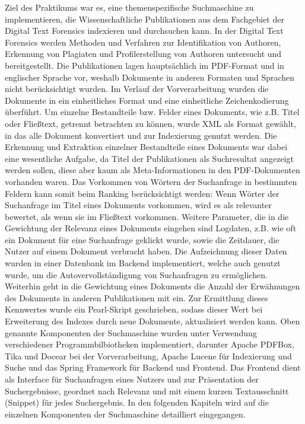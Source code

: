 Ziel des Praktikums war es, eine themenspezifische Suchmaschine zu implementieren, die Wissenschaftliche Publikationen aus dem Fachgebiet der Digital Text Forensics indexieren und durchsuchen kann. 
In der Digital Text Forensics werden Methoden und Verfahren zur Identifikation von Authoren, Erkennung von Plagiaten und Profilerstellung von Authoren untersucht und bereitgestellt. 
Die Publikationen lagen hauptsächlich im PDF-Format und in englischer Sprache vor, weshalb Dokumente in anderen Formaten und Sprachen nicht berücksichtigt wurden. 
Im Verlauf der Vorverarbeitung wurden die Dokumente in ein einheitliches Format und eine einheitliche Zeichenkodierung überführt. 
Um einzelne Bestandteile bzw. Felder eines Dokuments, wie z.B. Titel oder Fließtext, getrennt betrachten zu können, wurde XML als Format gewählt, in das alle Dokument konvertiert und zur Indexierung genutzt werden. 
Die Erkennung und Extraktion einzelner Bestandteile eines Dokuments war dabei eine wesentliche Aufgabe, da Titel der Publikationen als Suchresultat angezeigt werden sollen, diese aber kaum als Meta-Informationen in den PDF-Dokumenten vorhanden waren. 
Das Vorkommen von Wörtern der Suchanfrage in bestimmten Feldern kann somit beim Ranking berücksichtigt werden: Wenn Wörter der Suchanfrage im Titel eines Dokuments vorkommen, wird es als relevanter bewertet, als wenn sie im Fließtext vorkommen. 
Weitere Parameter, die in die Gewichtung der Relevanz eines Dokuments eingehen sind Logdaten, z.B. wie oft ein Dokument für eine Suchanfrage geklickt wurde, sowie die Zeitdauer, die Nutzer auf einem Dokument verbracht haben.
Die Aufzeichnung dieser Daten wurden in einer Datenbank im Backend implementiert, welche auch genutzt wurde, um die Autovervollständigung von Suchanfragen zu ermöglichen. 
Weiterhin geht in die Gewichtung eines Dokuments die Anzahl der Erwähnungen des Dokuments in anderen Publikationen mit ein. 
Zur Ermittlung dieses Kennwertes wurde ein Pearl-Skript geschrieben, sodass dieser Wert bei Erweiterung des Indexes durch neue Dokumente, aktualisiert werden kann. 
Oben genannte Komponenten der Suchmaschine wurden unter Verwendung verschiedener Programmbilbiotheken implementiert, darunter Apache PDFBox, Tika und Docear bei der Vorverarbeitung, Apache Lucene für Indexierung und Suche und das Spring Framework für Backend und Frontend. 
Das Frontend dient als Interface für Suchanfragen eines Nutzers und zur Präsentation der Suchergebnisse, geordnet nach Relevanz und mit einem kurzen Textausschnitt (Snippet) für jedes Suchergebnis. 
In den folgenden Kapiteln wird auf die einzelnen Komponenten der Suchmaschine detailliert eingegangen. 

